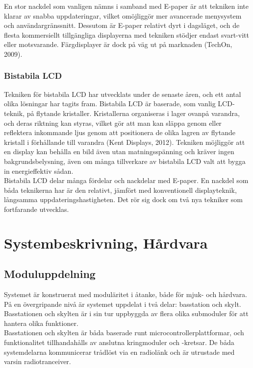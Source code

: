 \documentclass[a4paper,11pt]{article}
\begin{document}
En stor nackdel som vanligen nämns i samband med E-paper är att tekniken inte klarar av snabba uppdateringar, vilket omöjliggör mer avancerade menysystem och användargränssnitt. Dessutom är E-paper relativt dyrt i dagsläget, och de flesta kommersiellt tillgängliga displayerna med tekniken stödjer endast svart-vitt eller motsvarande. Färgdisplayer är dock på väg ut på marknaden (TechOn, 2009).

\subsubsection{Bistabila LCD}
Tekniken för bistabila LCD har utvecklats under de senaste åren, och ett antal olika lösningar har tagits fram. Bistabila LCD är baserade, som vanlig LCD-teknik, på flytande kristaller. Kristallerna organiseras i lager ovanpå varandra, och deras riktning kan styras, vilket gör att man kan släppa genom eller reflektera inkommande ljus genom att positionera de olika lagren av flytande kristall i förhållande till varandra (Kent Displays, 2012). Tekniken möjliggör att en display kan behålla en bild även utan matningsspänning och kräver ingen bakgrundsbelysning, även om många tillverkare av bistabila LCD valt att bygga in energieffektiv sådan. \\

Bistabila LCD delar många fördelar och nackdelar med E-paper. En nackdel som båda teknikerna har är den relativt, jämfört med konventionell displayteknik, långsamma uppdateringshastigheten. Det rör sig dock om två nya tekniker som fortfarande utvecklas.

\section{Systembeskrivning, Hårdvara}

\subsection{Moduluppdelning}
Systemet är konstruerat med moduläritet i åtanke, både för mjuk- och hårdvara. På en övergripande nivå är systemet uppdelat i två delar: basstation och skylt. Basstationen och skylten är i sin tur uppbyggda av flera olika submoduler för att hantera olika funktioner. \\

Basstationen och skylten är båda baserade runt microcontrollerplattformar, och funktionalitet tillhandahålls av anslutna kringmoduler och -kretsar. De båda systemdelarna kommunicerar trådlöst via en radiolänk och är utrustade med varsin radiotranceiver.
\end{document}
